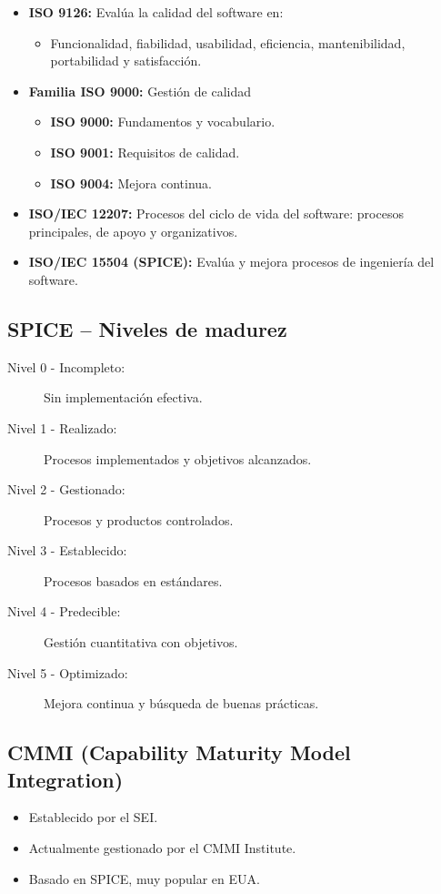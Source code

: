 \begin{itemize}
    \item \textbf{ISO 9126:} Evalúa la calidad del software en:
    \begin{itemize}
        \item Funcionalidad, fiabilidad, usabilidad, eficiencia, mantenibilidad, portabilidad y satisfacción.
    \end{itemize}
    \item \textbf{Familia ISO 9000:} Gestión de calidad
    \begin{itemize}
        \item \textbf{ISO 9000:} Fundamentos y vocabulario.
        \item \textbf{ISO 9001:} Requisitos de calidad.
        \item \textbf{ISO 9004:} Mejora continua.
    \end{itemize}

    \item \textbf{ISO/IEC 12207:} Procesos del ciclo de vida del software: procesos principales, de apoyo y organizativos.

    \item \textbf{ISO/IEC 15504 (SPICE):} Evalúa y mejora procesos de ingeniería del software.
\end{itemize}

\subsection{SPICE – Niveles de madurez}\label{subsec:spice--niveles-de-madurez}

\begin{description}
    \item[Nivel 0 - Incompleto:] Sin implementación efectiva.
    \item[Nivel 1 - Realizado:] Procesos implementados y objetivos alcanzados.
    \item[Nivel 2 - Gestionado:] Procesos y productos controlados.
    \item[Nivel 3 - Establecido:] Procesos basados en estándares.
    \item[Nivel 4 - Predecible:] Gestión cuantitativa con objetivos.
    \item[Nivel 5 - Optimizado:] Mejora continua y búsqueda de buenas prácticas.
\end{description}

\subsection{CMMI (Capability Maturity Model Integration)}\label{subsec:cmmi-(capability-maturity-model-integration)}

\begin{itemize}
    \item Establecido por el SEI\@.
    \item Actualmente gestionado por el CMMI Institute.
    \item Basado en SPICE, muy popular en EUA\@.
\end{itemize}